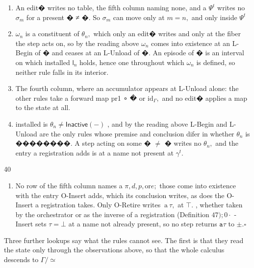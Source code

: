 \documentclass[
  10
]{article}
\newcounter{none} %
\providecommand{\tightlist}{%
  \setlength{\itemsep}{0pt}\setlength{\parskip}{0pt}}
\begin{document}
\begin{enumerate}
\def\labelenumi{(\arabic{enumi})}
\item
  An edit� writes no table, the fifth column naming none, and a
  \(\Psi ^ { t }\) writes no \(\sigma _ { m }\) for a present � ≠ �. So
  \(\sigma _ { m }\) can move only at \(m = n ,\) and only inside
  \(\Psi ^ { t }\)
\item
  \(\omega _ { n }\) is a constituent of \(\theta _ { n } ,\) which only
  an edit� writes and only at the fiber the step acts on, so by the
  reading above \(\omega _ { n }\) comes into existence at an L-Begin of
  � and ceases at an L-Unload of �. An episode of � is an interval on
  which installed \(\mathsf { l } _ { n }\) holds, hence one throughout
  which \(\omega _ { n }\) is defined, so neither rule falls in its
  interior.
\item
  The fourth column, where an accumulator appears at L-Unload alone: the
  other rules take a forward map pr1 ∘ � or
  \({ \mathrm { i d } } _ { \Gamma } ,\) and no edit� applies a map to
  the state at all.
\item
  installed is \(\theta _ { n } \neq \mathsf { I n a c t i v e ( - ) }\)
  , and by the reading above L-Begin and L-Unload are the only rules
  whose premise and conclusion difer in whether \(\theta _ { n }\) is
  ��������. A step acting on some � \(\neq\) � writes no
  \(\theta _ { n } ,\) and the entry a registration adds is at a name
  not present at \(\gamma ^ { t } .\)
\end{enumerate}

40

\begin{enumerate}
\def\labelenumi{(\arabic{enumi})}
\setcounter{enumi}{4}
\tightlist
\item
  No row of the fifth column names a
  \(\pi , d , p , \mathrm { o r } e ;\) those come into existence with
  the entry O-Insert adds, which its conclusion writes, as does the
  O-Insert a registration takes. Only O-Retire writes
  \(\mathrm { ~ a ~ } \tau ,\) at \(\top .\) , whether taken by the
  orchestrator or as the inverse of a registration (Definition
  \(4 7 ) ; 0 \cdot\) -Insert sets \(\tau = \bot\) at a name not already
  present, so no step returns \(\mathtt { a } \tau\) to
  \(\pm . \square\)
\end{enumerate}

Three further lookups say what the rules cannot see. The first is that
they read the state only through the observations above, so that the
whole calculus descends to \(\Gamma / \simeq\)
\end{document}
